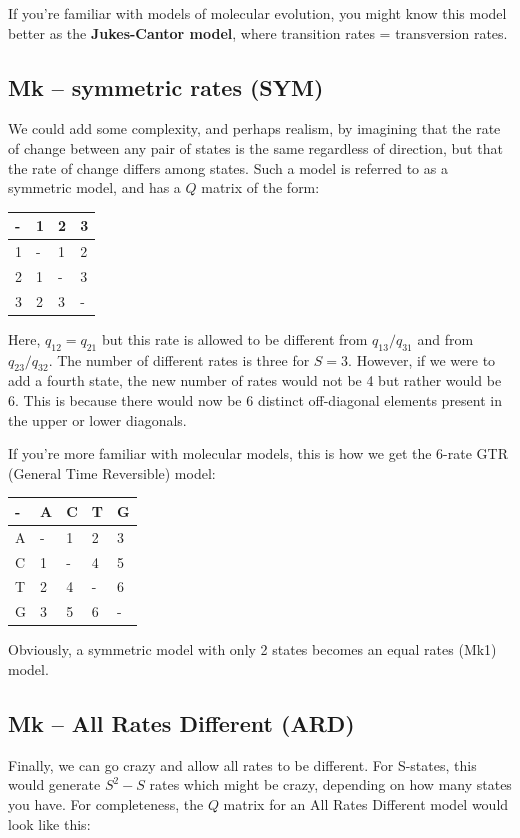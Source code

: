 \documentclass[]{book}
\theoremstyle{definition}
\theoremstyle{definition}
\theoremstyle{definition}
\theoremstyle{remark}
\begin{document}
If you're familiar with models of molecular evolution, you might know
this model better as the \textbf{Jukes-Cantor model}, where transition
rates = transversion rates.

\subsection{Mk -- symmetric rates (SYM)}\label{mk-symmetric-rates-sym}

We could add some complexity, and perhaps realism, by imagining that the
rate of change between any pair of states is the same regardless of
direction, but that the rate of change differs among states. Such a
model is referred to as a symmetric model, and has a \(Q\) matrix of the
form:

\begin{longtable}[]{@{}llll@{}}
\toprule
- & 1 & 2 & 3\tabularnewline
\midrule
\endhead
1 & - & 1 & 2\tabularnewline
2 & 1 & - & 3\tabularnewline
3 & 2 & 3 & -\tabularnewline
\bottomrule
\end{longtable}

Here, \(q_{12} = q_{21}\) but this rate is allowed to be different from
\(q_{13}/q_{31}\) and from \(q_{23}/q_{32}\). The number of different
rates is three for \(S = 3\). However, if we were to add a fourth state,
the new number of rates would not be 4 but rather would be 6. This is
because there would now be 6 distinct off-diagonal elements present in
the upper or lower diagonals.

If you're more familiar with molecular models, this is how we get the
6-rate GTR (General Time Reversible) model:

\begin{longtable}[]{@{}lllll@{}}
\toprule
- & A & C & T & G\tabularnewline
\midrule
\endhead
A & - & 1 & 2 & 3\tabularnewline
C & 1 & - & 4 & 5\tabularnewline
T & 2 & 4 & - & 6\tabularnewline
G & 3 & 5 & 6 & -\tabularnewline
\bottomrule
\end{longtable}

Obviously, a symmetric model with only 2 states becomes an equal rates
(Mk1) model.

\subsection{Mk -- All Rates Different
(ARD)}\label{mk-all-rates-different-ard}

Finally, we can go crazy and allow all rates to be different. For
S-states, this would generate \(S^2 - S\) rates which might be crazy,
depending on how many states you have. For completeness, the \(Q\)
matrix for an All Rates Different model would look like this:
\end{document}
